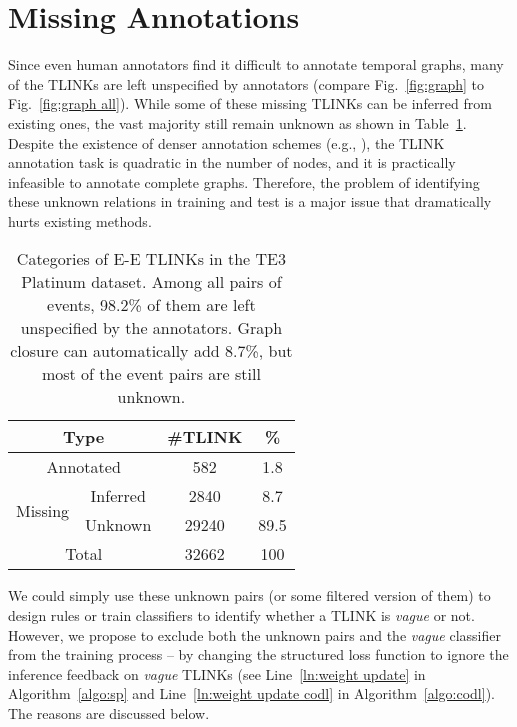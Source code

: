 \documentclass[11pt,letterpaper]{article}
\newcommand{\final}[1]{#1}
\begin{document}
\section{Missing Annotations}
\label{vaguelinks}
Since even human annotators find it difficult to annotate temporal graphs, many of the TLINKs are left unspecified by annotators (compare Fig.~\ref{fig:graph} to Fig.~\ref{fig:graph all}).
While some of these missing TLINKs can be inferred from existing ones, the vast majority still \final{remain} unknown as shown in Table~\ref{tab: unspecified}.
Despite the existence of denser annotation schemes (e.g., \citet{cassidy2014annotation}), the TLINK annotation task is quadratic in the number of nodes, and it is practically infeasible to annotate complete graphs. 
Therefore, the problem of identifying these unknown relations in training and test is a major issue that dramatically hurts existing methods.

\begin{table}[htbp!]
	\centering
	\caption{\small Categories of E-E TLINKs in the TE3 Platinum dataset. Among all pairs of events, 98.2\% of them are left unspecified by the annotators. Graph closure can automatically \final{add} 8.7\%, but most of the event pairs are still {unknown}.}
	\label{tab: unspecified}
	\begin{tabular}{ c|c|c|c } 
		\hline
		\multicolumn{2}{c|}{Type} & \#TLINK & \%\\
		\hline
		\multicolumn{2}{c|}{Annotated} & 582 & 1.8\\
		\hline
		\multirow{2}{*}{Missing}& Inferred & 2840 & 8.7\\ & Unknown & 29240 & 89.5\\ \hline
		\multicolumn{2}{c|}{Total} & 32662 & 100\\
		\hline
	\end{tabular}
\end{table}

We could simply use these unknown pairs (or some filtered version of them) to design rules or train classifiers to identify whether a TLINK is {\em vague} or not.
However, we propose to exclude both the unknown pairs and the {\em vague} classifier from the training process -- by changing the structured loss function to ignore the inference feedback on {\em vague} TLINKs (see Line~\ref{ln:weight update} in Algorithm~\ref{algo:sp} and Line~\ref{ln:weight update codl} in Algorithm~\ref{algo:codl}). The reasons are \final{discussed below}.
\end{document}

